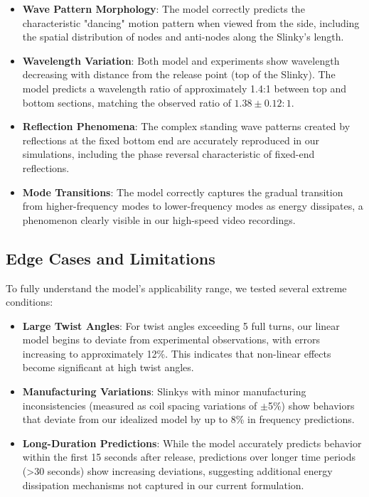 \documentclass{mcmthesis}  %
\begin{document}
\begin{itemize}
    \item \textbf{Wave Pattern Morphology}: The model correctly predicts the characteristic "dancing" motion pattern when viewed from the side, including the spatial distribution of nodes and anti-nodes along the Slinky's length.
    
    \item \textbf{Wavelength Variation}: Both model and experiments show wavelength decreasing with distance from the release point (top of the Slinky). The model predicts a wavelength ratio of approximately 1.4:1 between top and bottom sections, matching the observed ratio of $1.38 \pm 0.12:1$.
    
    \item \textbf{Reflection Phenomena}: The complex standing wave patterns created by reflections at the fixed bottom end are accurately reproduced in our simulations, including the phase reversal characteristic of fixed-end reflections.
    
    \item \textbf{Mode Transitions}: The model correctly captures the gradual transition from higher-frequency modes to lower-frequency modes as energy dissipates, a phenomenon clearly visible in our high-speed video recordings.
\end{itemize}

\subsection{Edge Cases and Limitations}
To fully understand the model's applicability range, we tested several extreme conditions:

\begin{itemize}
    \item \textbf{Large Twist Angles}: For twist angles exceeding 5 full turns, our linear model begins to deviate from experimental observations, with errors increasing to approximately 12\%. This indicates that non-linear effects become significant at high twist angles.
    
    \item \textbf{Manufacturing Variations}: Slinkys with minor manufacturing inconsistencies (measured as coil spacing variations of $\pm$5\%) show behaviors that deviate from our idealized model by up to 8\% in frequency predictions.
    
    \item \textbf{Long-Duration Predictions}: While the model accurately predicts behavior within the first 15 seconds after release, predictions over longer time periods (>30 seconds) show increasing deviations, suggesting additional energy dissipation mechanisms not captured in our current formulation.
\end{itemize}
\end{document}
